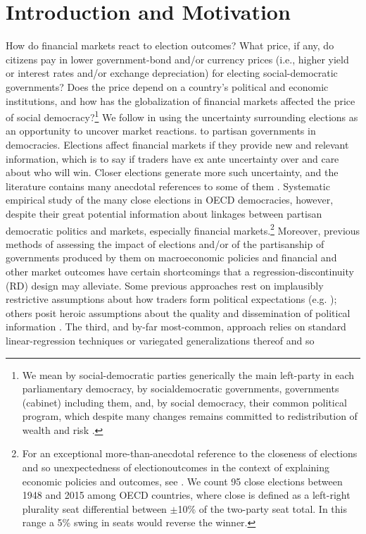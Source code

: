 \documentclass[12pt]{article}
\begin{document}
\pagebreak

\section{Introduction and Motivation}

How do financial markets react to election outcomes? What price, if any, do citizens pay in lower government-bond and/or currency prices (i.e., higher yield or interest rates and/or exchange depreciation) for electing social-democratic governments? Does the price depend on a country's political and economic institutions, and how has the globalization of financial markets affected the price of social democracy?\footnote{We mean by social-democratic parties generically the main left-party in each parliamentary democracy, by socialdemocratic governments, governments (cabinet) including them, and, by social democracy, their common political program, which despite many changes remains committed to redistribution of wealth and risk \citep{Garrett1998}.} We follow \citet{Alesina1997, Herron2000, Bernhard2006} in using the uncertainty surrounding elections as an opportunity to uncover market reactions. to partisan governments in democracies. Elections affect financial markets if they provide new and relevant information, which is to say if traders have ex ante uncertainty over and care about who will win. Closer elections generate more such uncertainty, and the literature contains many anecdotal references to some of them \citep{Alesina1997, Bachman1992, Herron2000}. Systematic empirical study of the many close elections in OECD democracies, however, despite their great potential information about linkages between partisan democratic politics and markets, especially financial markets.\footnote{For an exceptional more-than-anecdotal reference to the closeness of elections and so unexpectedness of electionoutcomes in the context of explaining economic policies and outcomes, see \citet{Carlsen1999}. We count 95 close elections between 1948 and 2015 among OECD countries, where close is defined as a left-right plurality seat differential between $\pm$10\% of the two-party seat total. In this range a 5\% swing in seats would reverse the winner.} Moreover, previous methods of assessing the impact of elections and/or of the partisanship of governments produced by them on macroeconomic policies and financial and other market outcomes have certain shortcomings that a regression-discontinuity (RD) design may alleviate. Some previous approaches rest on implausibly restrictive assumptions about how traders form political expectations (e.g. \citet{Alesina1997}); others posit heroic assumptions about the quality and dissemination of political information \citep{Herron2000}. The third, and by-far most-common, approach relies on standard linear-regression techniques or variegated generalizations thereof and so 
\end{document}
